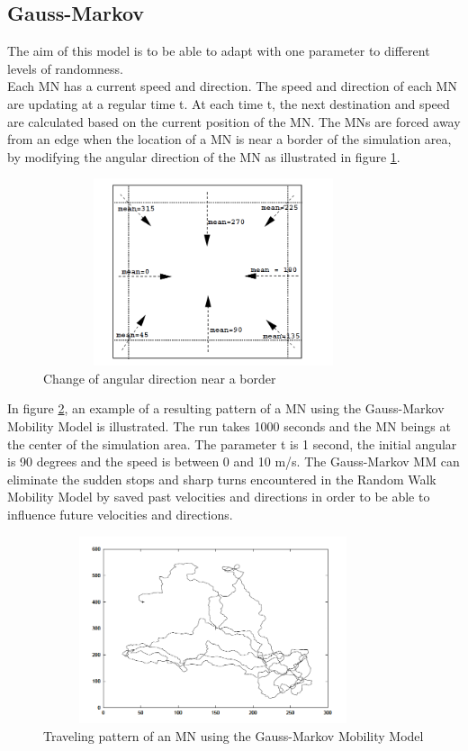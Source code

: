 \newpage

\subsection{Gauss-Markov}

The aim of this model is to be able to adapt with one parameter to different levels of randomness.\\
Each MN has a current speed and direction. The speed and direction of each MN are updating at a regular time t. At each time t, the next destination and speed are calculated based on the current position of the MN. The MNs are forced away from an edge when the location of a MN is near a border of the simulation area, by modifying the angular direction of the MN as illustrated in figure \ref{Gauss-MarkovFig1}.\\

\begin{figure}[h]
\center
\includegraphics[width=10cm,height=55mm]{../images/gauss-markovmodel1.png}
\caption{\label{Gauss-MarkovFig1} Change of angular direction near a border}
\end{figure}

In figure \ref{Gauss-MarkovFig2}, an example of a resulting pattern of a MN using the Gauss-Markov Mobility Model is illustrated. The run takes 1000 seconds and the MN beings at the center of the simulation area. The parameter t is 1 second, the initial angular is 90 degrees and the speed is between 0 and 10 m/s. The Gauss-Markov MM can eliminate the sudden stops and sharp turns encountered in the Random Walk Mobility Model by saved past velocities and directions in order to be able to influence future velocities and directions.\\

\begin{figure}[h]
\center
\includegraphics[width=10cm,height=55mm]{../images/gauss-markovmodel2.png}
\caption{\label{Gauss-MarkovFig2} Traveling pattern of an MN using the Gauss-Markov Mobility Model}
\end{figure}


